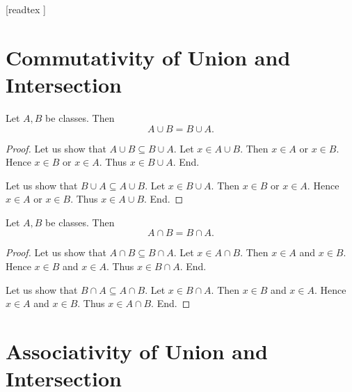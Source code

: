 \documentclass[10pt]{article}
\begin{document}
  \begin{imports}
    \begin{forthel}
      [readtex ]
    \end{forthel}
  \end{imports}


  \section{Commutativity of Union and Intersection}

  \begin{forthel}
    \begin{proposition}
      Let $A, B$ be classes.
      Then \[ A \cup B = B \cup A. \]
    \end{proposition}
    \begin{proof}
      Let us show that $A \cup B \subseteq B \cup A$.
        Let $x \in A \cup B$.
        Then $x \in A$ or $x \in B$.
        Hence $x \in B$ or $x \in A$.
        Thus $x \in B \cup A$.
      End.

      Let us show that $B \cup A \subseteq A \cup B$.
        Let $x \in B \cup A$.
        Then $x \in B$ or $x \in A$.
        Hence $x \in A$ or $x \in B$.
        Thus $x \in A \cup B$.
      End.
    \end{proof}
  \end{forthel}

  \begin{forthel}
    \begin{proposition}
      Let $A, B$ be classes.
      Then \[ A \cap B = B \cap A. \]
    \end{proposition}
    \begin{proof}
      Let us show that $A \cap B \subseteq B \cap A$.
        Let $x \in A \cap B$.
        Then $x \in A$ and $x \in B$.
        Hence $x \in B$ and $x \in A$.
        Thus $x \in B \cap A$.
      End.

      Let us show that $B \cap A \subseteq A \cap B$.
        Let $x \in B \cap A$.
        Then $x \in B$ and $x \in A$.
        Hence $x \in A$ and $x \in B$.
        Thus $x \in A \cap B$.
      End.
    \end{proof}
  \end{forthel}


  \section{Associativity of Union and Intersection}
\end{document}
